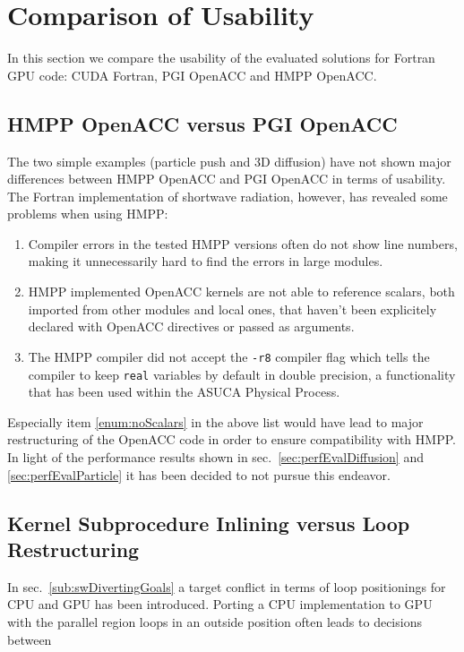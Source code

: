 \clearpage
\section{Comparison of Usability} \label{sec:usabilityComparison}

In this section we compare the usability of the evaluated solutions for Fortran GPU code: CUDA Fortran, PGI OpenACC and HMPP OpenACC.

\subsection{HMPP OpenACC versus PGI OpenACC} \label{sub:hmppVsPGIUsability}

The two simple examples (particle push and 3D diffusion) have not shown major differences between HMPP OpenACC and PGI OpenACC in terms of usability. The Fortran implementation of shortwave radiation, however, has revealed some problems when using HMPP:
\begin{enumerate}
 \item Compiler errors in the tested HMPP versions often do not show line numbers, making it unnecessarily hard to find the errors in large modules.
 \item \label{enum:noScalars} HMPP implemented OpenACC kernels are not able to reference scalars, both imported from other modules and local ones, that haven't been explicitely declared with OpenACC directives or passed as arguments. 
 \item The HMPP compiler did not accept the \verb|-r8| compiler flag which tells the compiler to keep \verb|real| variables by default in double precision, a functionality that has been used within the ASUCA Physical Process.
\end{enumerate}

Especially item \ref{enum:noScalars} in the above list would have lead to major restructuring of the OpenACC code in order to ensure compatibility with HMPP. In light of the performance results shown in sec.~\ref{sec:perfEvalDiffusion} and \ref{sec:perfEvalParticle} it has been decided to not pursue this endeavor.

\subsection{Kernel Subprocedure Inlining versus Loop Restructuring} \label{sub:inliningUsability}

In sec.~\ref{sub:swDivertingGoals} a target conflict in terms of loop positionings for CPU and GPU has been introduced. Porting a CPU implementation to GPU with the parallel region loops in an outside position often leads to decisions between

